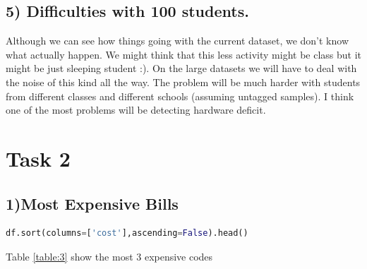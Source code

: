 \documentclass[10pt]{article}
\begin{document}
\subsection*{5) Difficulties with 100 students.}
Although we can see how things going with the current dataset, we don't know what actually happen. We might think that this less activity might be class but it might be just sleeping student :). On the large datasets we will have to deal with the noise of this kind all the way. The problem will be much harder with students from different classes and different schools (assuming untagged samples). I think one of the most problems will be detecting hardware deficit.
\section*{Task 2}
\subsection*{1)Most Expensive Bills}
\begin{lstlisting}[language=python]
df.sort(columns=['cost'],ascending=False).head()
\end{lstlisting}
Table \ref{table:3} show the most 3 expensive codes 
\end{document}
